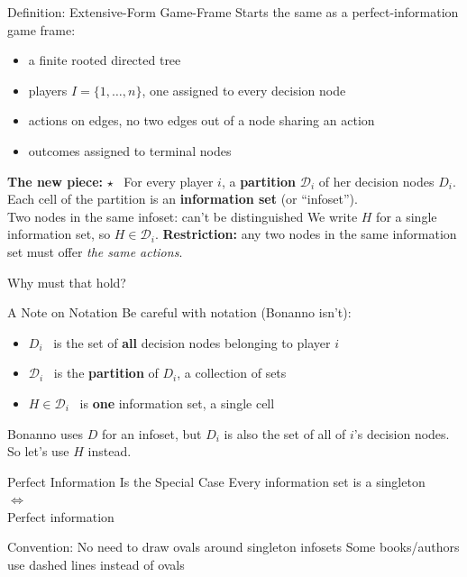 \begin{frame}{Definition: Extensive-Form Game-Frame}
Starts the same as a perfect-information game frame:
\bsk
\begin{itemize}
    \item a finite rooted directed tree
    \item players $I=\{1,\ldots,n\}$, one assigned to every decision node
    \item actions on edges, no two edges out of a node sharing an action
    \item outcomes assigned to terminal nodes
\end{itemize}
\bsk
\textbf{The new piece:}
$\star$ \ For every player $i$, a \textbf{partition} $\mathcal{D}_i$ of her decision
nodes $D_i$.\\
Each cell of the partition is an \textbf{information set} (or ``infoset'').\\
Two nodes in the same infoset: can't be distinguished
\bsk
We write $H$ for a single information set, so $H\in\mathcal{D}_i$.
\bsk
\centering
\textbf{Restriction:} any two nodes in the same information set must offer
\textit{the same actions}.
\vfill
\raggedright
Why must that hold? \vspace{0.3in}
\end{frame}

\begin{frame}{A Note on Notation}
Be careful with notation (Bonanno isn't):
\bsk
\begin{itemize}
    \item $D_i$ \ is the set of \textbf{all} decision nodes belonging to player $i$
      \vspace{0.15in}
    \item $\mathcal{D}_i$ \ is the \textbf{partition} of $D_i$, a collection of sets
      \vspace{0.15in}
    \item $H\in\mathcal{D}_i$ \ is \textbf{one} information set, a single cell
\end{itemize}
\vfill
{\footnotesize Bonanno uses $D$ for an infoset, but $D_i$ is also the set of all of $i$'s decision nodes. So let's use $H$ instead.}
\vspace{-0.2in}
\end{frame}

\begin{frame}{Perfect Information Is the Special Case}
\vfill
\centering
\large
Every information set is a singleton\\
\bsk
$\Longleftrightarrow$\\
\bsk
Perfect information
\vfill
\normalsize
\raggedright
Convention: No need to draw ovals around singleton infosets
\bsk
Some books/authors use dashed lines instead of ovals
\vspace{-0.4in}
\end{frame}


